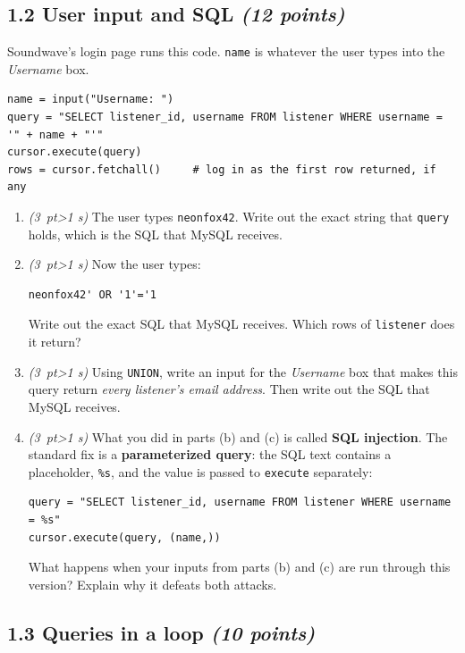 \documentclass[11pt]{article}
\newcommand{\code}[1]{\texttt{#1}}
\newcommand{\pts}[1]{\hfill\textit{(#1 points)}}
\newcommand{\pt}[1]{\textit{(#1~pt\ifnum#1>1 s\fi)}}
\begin{document}
\subsection*{1.2 User input and SQL \pts{12}}

Soundwave's login page runs this code. \code{name} is whatever the user types
into the \emph{Username} box.

\begin{lstlisting}[style=py]
name = input("Username: ")
query = "SELECT listener_id, username FROM listener WHERE username = '" + name + "'"
cursor.execute(query)
rows = cursor.fetchall()     # log in as the first row returned, if any
\end{lstlisting}

\begin{enumerate}[label=(\alph*)]
  \item \pt{3} The user types \code{neonfox42}. Write out the exact string that
  \code{query} holds, which is the SQL that MySQL receives.

  \item \pt{3} Now the user types:
\begin{lstlisting}
neonfox42' OR '1'='1
\end{lstlisting}
  Write out the exact SQL that MySQL receives. Which rows of \code{listener}
  does it return?

  \item \pt{3} Using \code{UNION}, write an input for the \emph{Username} box
  that makes this query return \emph{every listener's email address}. Then write
  out the SQL that MySQL receives.

  \item \pt{3} What you did in parts (b) and (c) is called \textbf{SQL
  injection}. The standard fix is a \textbf{parameterized query}: the SQL text
  contains a placeholder, \code{\%s}, and the value is passed to \code{execute}
  separately:
\begin{lstlisting}[style=py]
query = "SELECT listener_id, username FROM listener WHERE username = %s"
cursor.execute(query, (name,))
\end{lstlisting}
  What happens when your inputs from parts (b) and (c) are run through this
  version? Explain why it defeats both attacks.
\end{enumerate}

\subsection*{1.3 Queries in a loop \pts{10}}
\end{document}
